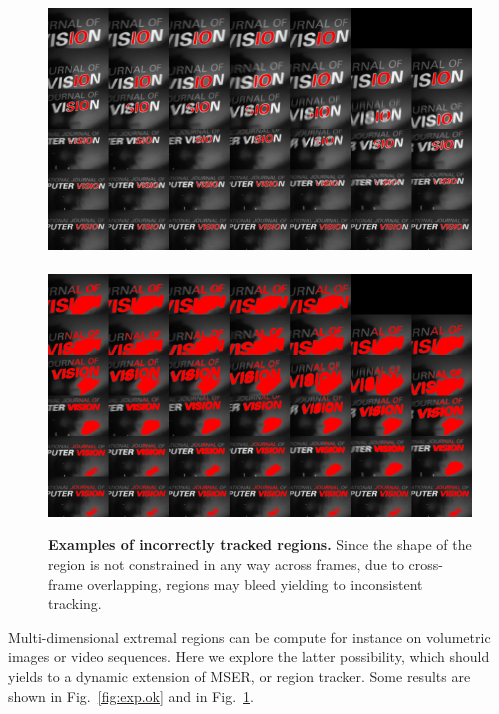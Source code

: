 \documentclass{article}
\begin{document}
\begin{figure}
\begin{center}
\includegraphics[width=.48\textwidth]{figures/region-171.png}\ %
\includegraphics[width=.48\textwidth]{figures/region-612.png}\\
\end{center}
\caption{{\bf Examples of incorrectly tracked regions.} Since the shape of the region is not constrained in any way across frames, due to cross-frame overlapping, regions may bleed yielding to inconsistent tracking.}
\label{fig:exp.bleed}
\end{figure}

Multi-dimensional extremal regions can be compute for instance on volumetric images or video sequences. Here we explore the latter possibility, which should yields to a dynamic extension of MSER, or region tracker. Some results are
shown in Fig.~\ref{fig:exp.ok} and in Fig.~\ref{fig:exp.bleed}.


%

\end{document}
